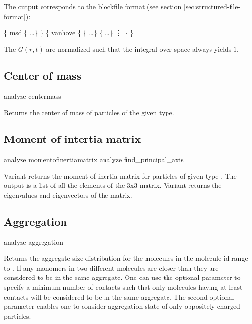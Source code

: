 The output corresponds to the blockfile format (see section
\vref{sec:structured-file-format}):
\begin{code}
\{ msd \{   \dots \} \} 
\{ vanhove \{ \{   \dots \} 
            \{   \dots \}
\vdots
          \}
\}
\end{code}

The $G(r,t)$ are normalized such that the integral over space always
yields $1$.

\subsection{Center of mass}
\label{analyze:centermass}
\begin{essyntax}
  analyze centermass 
\end{essyntax}
Returns the center of mass of particles of the given type.

\subsection{Moment of intertia matrix}
\label{analyze:momentofinteratiamatrix}
\label{analyze:find-principal-axis}

\begin{essyntax}
   analyze momentofinertiamatrix {  } 
   analyze find_principal_axis 
\end{essyntax}
Variant  returns the moment of inertia matrix for particles
of given type . The output is a list of all the
elements of the 3x3 matrix. Variant  returns the
eigenvalues and eigenvectors of the matrix.

\subsection{Aggregation}
\label{analyze:aggregation}

\begin{essyntax}
  analyze aggregation  
   
\end{essyntax}
Returns the aggregate size distribution for the molecules in the
molecule id range  to . If any monomers in
two different molecules are closer than  they are
considered to be in the same aggregate. One can use the optional
 parameter to specify a minimum number of contacts
such that only molecules having at least  contacts
will be considered to be in the same aggregate. The second optional
parameter  enables one to consider aggregation
state of only oppositely charged particles.


